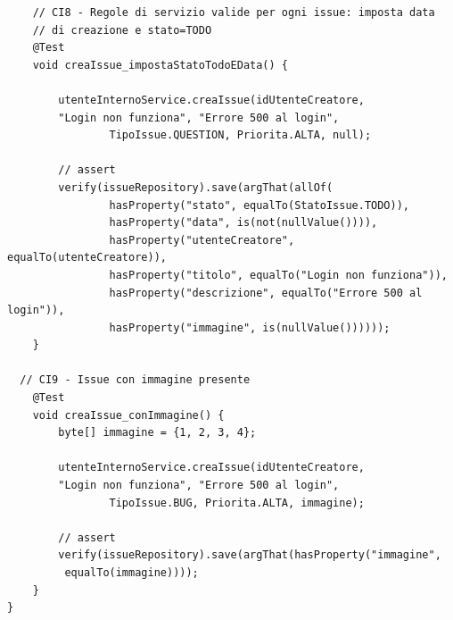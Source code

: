 \begin{listing}[!ht]
\begin{verbatim}
    // CI8 - Regole di servizio valide per ogni issue: imposta data 
    // di creazione e stato=TODO
    @Test
    void creaIssue_impostaStatoTodoEData() {

        utenteInternoService.creaIssue(idUtenteCreatore, 
        "Login non funziona", "Errore 500 al login",
                TipoIssue.QUESTION, Priorita.ALTA, null);

        // assert
        verify(issueRepository).save(argThat(allOf(
                hasProperty("stato", equalTo(StatoIssue.TODO)),
                hasProperty("data", is(not(nullValue()))),
                hasProperty("utenteCreatore", equalTo(utenteCreatore)),
                hasProperty("titolo", equalTo("Login non funziona")),
                hasProperty("descrizione", equalTo("Errore 500 al login")),
                hasProperty("immagine", is(nullValue())))));
    }

  // CI9 - Issue con immagine presente
    @Test
    void creaIssue_conImmagine() {
        byte[] immagine = {1, 2, 3, 4};

        utenteInternoService.creaIssue(idUtenteCreatore, 
        "Login non funziona", "Errore 500 al login",
                TipoIssue.BUG, Priorita.ALTA, immagine);

        // assert
        verify(issueRepository).save(argThat(hasProperty("immagine",
         equalTo(immagine))));
    }
}
\end{verbatim}
\end{listing}

